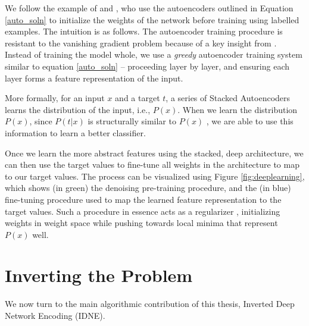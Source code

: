 We follow the example of \citep{Bengio:2007uq} and \citep{Vincent:2010fk}, who use the autoencoders outlined in Equation \eqref{auto_soln} to initialize the weights of the network before training using labelled examples. The intuition is as follows. The autoencoder training procedure is resistant to the vanishing gradient problem because of a key insight from \citep{Hinton:2006vn}. Instead of training the model whole, we use a \emph{greedy} autoencoder training system similar to equation \eqref{auto_soln} -- proceeding layer by layer, and ensuring each layer forms a feature representation of the input.

More formally, for an input $x$ and a target $t$, a series of Stacked Autoencoders learns the distribution of the input, i.e., $P(x)$. When we learn the distribution $P(x)$, since $P(t\vert x)$ is structurally similar to $P(x)$ \citep{Erhan:2010:WUP:1756006.1756025}, we are able to use this information to learn a better classifier. 

Once we learn the more abstract features using the stacked, deep architecture, we can then use the target values to fine-tune \citep{Hinton:2006vn} all weights in the architecture to map to our target values. The process can be visualized using Figure \ref{fig:deeplearning}, which shows (in green) the denoising pre-training procedure, and the (in blue) fine-tuning procedure used to map the learned feature representation to the target values. Such a procedure in essence acts as a regularizer \citep{Bengio2009LearningDeep}, initializing weights in weight space while pushing towards local minima that represent $P(x)$ well.

\section{Inverting the Problem}

We now turn to the main algorithmic contribution of this thesis, Inverted Deep Network Encoding (IDNE).

